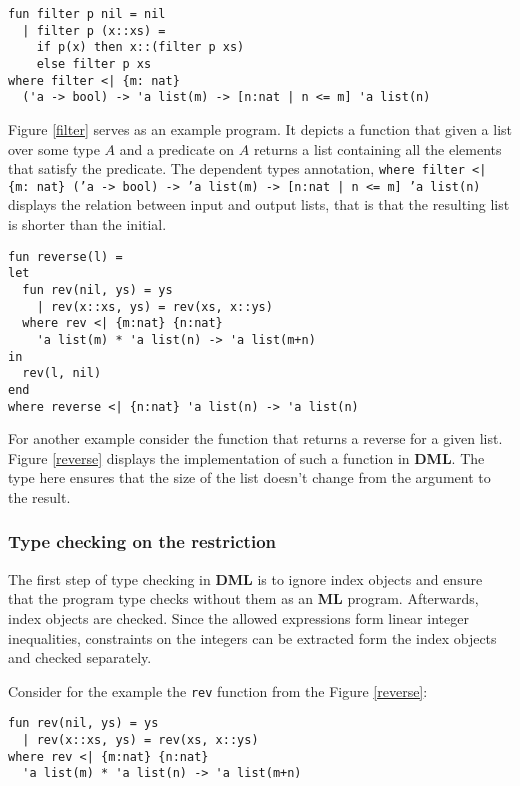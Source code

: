 \documentclass[a4paper,UKenglish]{lipics-v2016}
\begin{document}
\begin{lstlisting}[caption={The filter function for lists},label=filter,captionpos=t,float,abovecaptionskip=-\medskipamount]
fun filter p nil = nil
  | filter p (x::xs) =
    if p(x) then x::(filter p xs)
    else filter p xs
where filter <| {m: nat}
  ('a -> bool) -> 'a list(m) -> [n:nat | n <= m] 'a list(n)
\end{lstlisting}

Figure \ref{filter} serves as an example program. It depicts a function that
given a list over some type $A$ and a predicate on $A$ returns a list
containing all the elements that satisfy the predicate. The dependent types
annotation, \texttt{where filter <| \{m: nat\} ('a -> bool) -> 'a list(m) ->
[n:nat | n <= m] 'a list(n)} displays the relation between input and output
lists, that is that the resulting list is shorter than the initial.

\begin{lstlisting}[caption={The reverse function for lists},label=reverse,captionpos=t,float,abovecaptionskip=-\medskipamount]
fun reverse(l) =
let
  fun rev(nil, ys) = ys
    | rev(x::xs, ys) = rev(xs, x::ys)
  where rev <| {m:nat} {n:nat}
    'a list(m) * 'a list(n) -> 'a list(m+n)
in
  rev(l, nil)
end
where reverse <| {n:nat} 'a list(n) -> 'a list(n)
\end{lstlisting}

For another example consider the function that returns a reverse for a given
list. Figure \ref{reverse} displays the implementation of such a function in
\textbf{DML}. The type here ensures that the size of the list doesn't change
from the argument to the result.

\subsubsection{Type checking on the restriction}

The first step of type checking in \textbf{DML} is to ignore index objects and
ensure that the program type checks without them as an \textbf{ML} program.
Afterwards, index objects are checked. Since the allowed expressions form
linear integer inequalities, constraints on the integers can be extracted form
the index objects and checked separately.

Consider for the example the \texttt{rev} function from the Figure
\ref{reverse}:
\begin{verbatim}
fun rev(nil, ys) = ys
  | rev(x::xs, ys) = rev(xs, x::ys)
where rev <| {m:nat} {n:nat}
  'a list(m) * 'a list(n) -> 'a list(m+n)
\end{verbatim}
\end{document}
